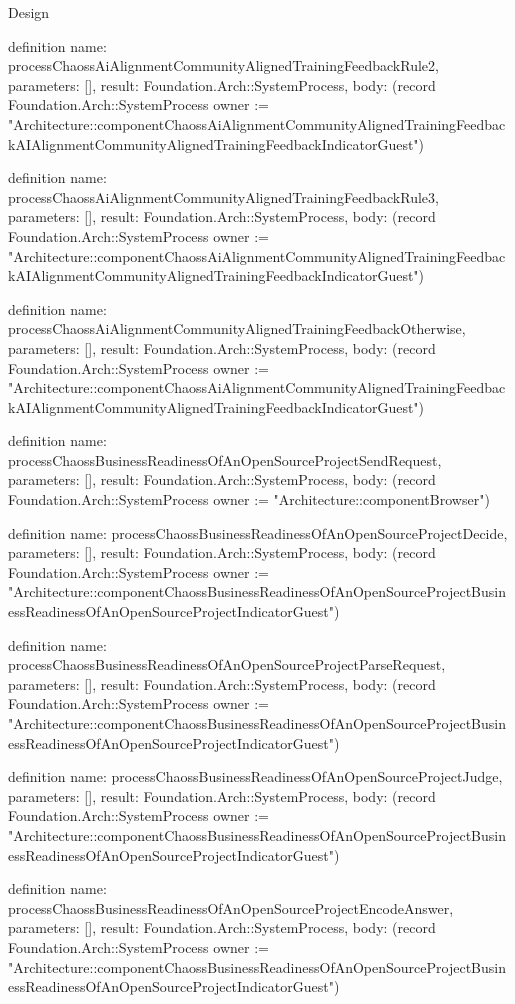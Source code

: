 \begin{lexlean}{Design}
\begin{semanticmodule}
definition{
  name: processChaossAiAlignmentCommunityAlignedTrainingFeedbackRule2,
  parameters: [],
  result: Foundation.Arch::SystemProcess,
  body: (record Foundation.Arch::SystemProcess {owner := "Architecture::componentChaossAiAlignmentCommunityAlignedTrainingFeedbackAIAlignmentCommunityAlignedTrainingFeedbackIndicatorGuest"})
}

definition{
  name: processChaossAiAlignmentCommunityAlignedTrainingFeedbackRule3,
  parameters: [],
  result: Foundation.Arch::SystemProcess,
  body: (record Foundation.Arch::SystemProcess {owner := "Architecture::componentChaossAiAlignmentCommunityAlignedTrainingFeedbackAIAlignmentCommunityAlignedTrainingFeedbackIndicatorGuest"})
}

definition{
  name: processChaossAiAlignmentCommunityAlignedTrainingFeedbackOtherwise,
  parameters: [],
  result: Foundation.Arch::SystemProcess,
  body: (record Foundation.Arch::SystemProcess {owner := "Architecture::componentChaossAiAlignmentCommunityAlignedTrainingFeedbackAIAlignmentCommunityAlignedTrainingFeedbackIndicatorGuest"})
}

definition{
  name: processChaossBusinessReadinessOfAnOpenSourceProjectSendRequest,
  parameters: [],
  result: Foundation.Arch::SystemProcess,
  body: (record Foundation.Arch::SystemProcess {owner := "Architecture::componentBrowser"})
}

definition{
  name: processChaossBusinessReadinessOfAnOpenSourceProjectDecide,
  parameters: [],
  result: Foundation.Arch::SystemProcess,
  body: (record Foundation.Arch::SystemProcess {owner := "Architecture::componentChaossBusinessReadinessOfAnOpenSourceProjectBusinessReadinessOfAnOpenSourceProjectIndicatorGuest"})
}

definition{
  name: processChaossBusinessReadinessOfAnOpenSourceProjectParseRequest,
  parameters: [],
  result: Foundation.Arch::SystemProcess,
  body: (record Foundation.Arch::SystemProcess {owner := "Architecture::componentChaossBusinessReadinessOfAnOpenSourceProjectBusinessReadinessOfAnOpenSourceProjectIndicatorGuest"})
}

definition{
  name: processChaossBusinessReadinessOfAnOpenSourceProjectJudge,
  parameters: [],
  result: Foundation.Arch::SystemProcess,
  body: (record Foundation.Arch::SystemProcess {owner := "Architecture::componentChaossBusinessReadinessOfAnOpenSourceProjectBusinessReadinessOfAnOpenSourceProjectIndicatorGuest"})
}

definition{
  name: processChaossBusinessReadinessOfAnOpenSourceProjectEncodeAnswer,
  parameters: [],
  result: Foundation.Arch::SystemProcess,
  body: (record Foundation.Arch::SystemProcess {owner := "Architecture::componentChaossBusinessReadinessOfAnOpenSourceProjectBusinessReadinessOfAnOpenSourceProjectIndicatorGuest"})
}


\end{semanticmodule}
\end{lexlean}
